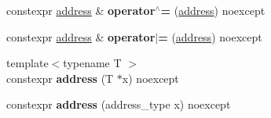 \begin{DoxyCompactItemize}
constexpr \mbox{\hyperlink{classdistant_1_1memory_1_1address}{address}} \& {\bfseries operator$^\wedge$=} (\mbox{\hyperlink{classdistant_1_1memory_1_1address}{address}}) noexcept
\item 
\mbox{\label{classdistant_1_1memory_1_1address_a920b0e3ae67efadeee2273ed1a3e3cd3}} 
constexpr \mbox{\hyperlink{classdistant_1_1memory_1_1address}{address}} \& {\bfseries operator$\vert$=} (\mbox{\hyperlink{classdistant_1_1memory_1_1address}{address}}) noexcept
\item 
\mbox{\label{classdistant_1_1memory_1_1address_adadb260d041b06f68a1bf827432e1918}} 
{\footnotesize template$<$typename T $>$ }\\constexpr {\bfseries address} (T $\ast$x) noexcept
\item 
\mbox{\label{classdistant_1_1memory_1_1address_a4dc4cad050aef738a19ebb63ed94e13d}} 
constexpr {\bfseries address} (address\+\_\+type x) noexcept
\end{DoxyCompactItemize}
